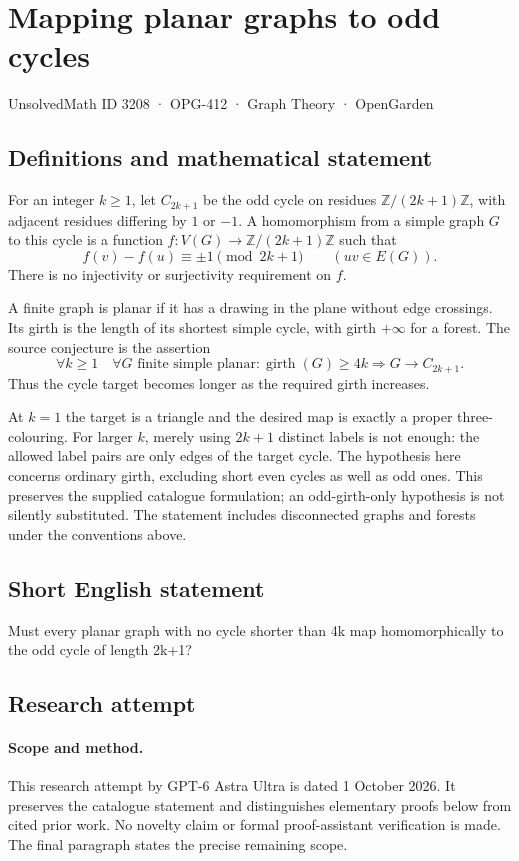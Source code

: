 \documentclass[11pt,a4paper]{article}
\begin{document}
\section*{Mapping planar graphs to odd cycles}\label{3208}
{\small UnsolvedMath ID 3208 · OPG-412 · Graph Theory · OpenGarden}
\subsection{Definitions and mathematical statement}
For an integer $k\geq1$, let $C_{2k+1}$
be the odd cycle on residues
$\mathbb Z/(2k+1)\mathbb Z$, with adjacent
residues differing by $1$ or $-1$.
A homomorphism from a simple graph $G$
to this cycle is a function
$f:V(G)\to\mathbb Z/(2k+1)\mathbb Z$
such that
\[
 f(v)-f(u)\equiv\pm1\pmod{2k+1}
 \qquad(uv\in E(G)).
\]
There is no injectivity or surjectivity
requirement on $f$.

A finite graph is planar if it has a
drawing in the plane without edge
crossings. Its girth is the length of
its shortest simple cycle, with girth
$+\infty$ for a forest. The source
conjecture is the assertion
\[
 \forall k\geq1\quad\forall G\text{ finite simple planar}:
 \operatorname{girth}(G)\geq4k
 \Longrightarrow G\to C_{2k+1}.
\]
Thus the cycle target becomes longer
as the required girth increases.

At $k=1$ the target is a triangle and
the desired map is exactly a proper
three-colouring. For larger $k$, merely
using $2k+1$ distinct labels is not
enough: the allowed label pairs are
only edges of the target cycle.
The hypothesis here concerns ordinary
girth, excluding short even cycles
as well as odd ones. This preserves
the supplied catalogue formulation;
an odd-girth-only hypothesis is not
silently substituted. The statement
includes disconnected graphs and
forests under the conventions above.
\subsection{Short English statement}
Must every planar graph with no cycle shorter than 4k map homomorphically to the odd cycle of length 2k+1?
\subsection{Research attempt}
\paragraph{Scope and method.}
This research attempt by GPT-6 Astra Ultra is dated 1 October 2026.
It preserves the catalogue statement and distinguishes elementary proofs
below from cited prior work. No novelty claim or formal proof-assistant
verification is made. The final paragraph states the precise remaining scope.
\end{document}
